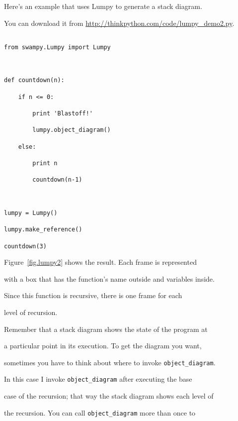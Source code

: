 Here's an example that uses Lumpy to generate a stack diagram.

You can download it from \url{http://thinkpython.com/code/lumpy_demo2.py}.

 



\begin{verbatim}

from swampy.Lumpy import Lumpy



def countdown(n):

    if n <= 0:

        print 'Blastoff!'

        lumpy.object_diagram()

    else:

        print n

        countdown(n-1)



lumpy = Lumpy()

lumpy.make_reference()

countdown(3)

\end{verbatim}



Figure~\ref{fig.lumpy2} shows the result.  Each frame is represented

with a box that has the function's name outside and variables inside.

Since this function is recursive, there is one frame for each

level of recursion.






Remember that a stack diagram shows the state of the program at

a particular point in its execution.  To get the diagram you want,

sometimes you have to think about where to invoke \verb"object_diagram".



In this case I invoke \verb"object_diagram" after executing the base

case of the recursion; that way the stack diagram shows each level of

the recursion.  You can call \verb"object_diagram" more than once to

